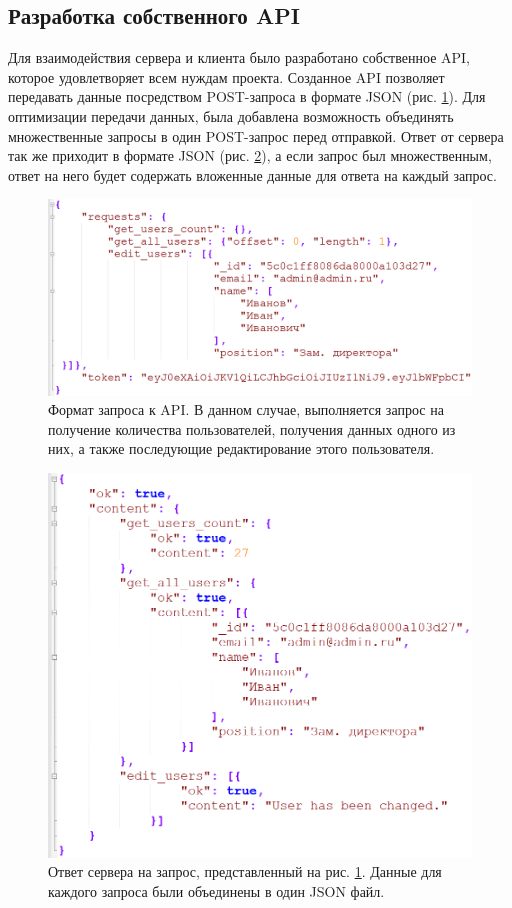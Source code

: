 \clearpage
\subsection{Разработка собственного API}
Для взаимодействия сервера и клиента было разработано собственное API, которое удовлетворяет всем нуждам проекта.
Созданное API позволяет передавать данные посредством POST-запроса в формате JSON (рис. \ref{fig:req}).
Для оптимизации передачи данных, была добавлена возможность объединять множественные запросы в один POST-запрос перед отправкой.
Ответ от сервера так же приходит в формате JSON (рис. \ref{fig:ans}), а если запрос был множественным,
ответ на него будет содержать вложенные данные для ответа на каждый запрос.
\begin{figure}[h]
    \centering
    \includegraphics[width=1\linewidth]{img/req.png}
    \caption{Формат запроса к API. В данном случае, выполняется запрос на получение количества пользователей,
    получения данных одного из них, а также последующие редактирование этого пользователя.}
    \label{fig:req}
\end{figure}

\begin{figure}[h]
    \centering
    \includegraphics[width=1\linewidth]{img/ans.png}
    \caption{Ответ сервера на запрос, представленный на рис. \ref{fig:req}. Данные для каждого запроса были объединены в один JSON файл.}
    \label{fig:ans}
\end{figure}


